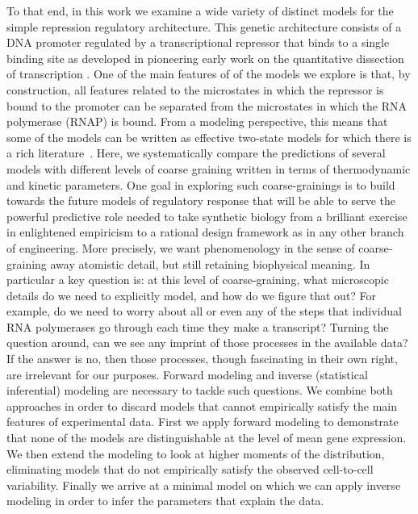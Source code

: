 To that end, in this work we examine a wide variety of distinct models for the
simple repression regulatory architecture. This genetic architecture consists of
a DNA promoter regulated by a transcriptional repressor that binds to a single
binding site as developed in pioneering early work on the quantitative
dissection of transcription \cite{Oehler1994, Oehler1990}. One of the main
features of of the models we explore is that, by construction, all features
related to the microstates in which the repressor is bound to the promoter can
be separated from the microstates in which the RNA polymerase (RNAP) is bound.
From a modeling perspective, this means that some of the models can be written
as effective two-state models for which there is a rich
literature~\cite{Peccoud1995, Shahrezaei2008, Iyer-Biswas2009, Tkacik2009,
Sanchez2013, Jones2014, So2011, Munsky2012}. Here, we systematically compare the
predictions of several models with different levels of coarse graining written
in terms of thermodynamic and kinetic parameters. One goal in exploring such
coarse-grainings is to build towards the future models of regulatory response
that will be able to serve the powerful predictive role needed to take synthetic
biology from a brilliant exercise in enlightened empiricism to a rational design
framework as in any other branch of engineering. More precisely, we want
phenomenology in the sense of coarse-graining away atomistic detail, but still
retaining biophysical meaning. In particular a key question is: at this level of
coarse-graining, what microscopic details do we need to explicitly model, and
how do we figure that out? For example, do we need to worry about all or even
any of the steps that individual RNA polymerases go through each time they make
a transcript? Turning the question around, can we see any imprint of those
processes in the available data? If the answer is no, then those processes,
though fascinating in their own right, are irrelevant for our purposes. Forward
modeling and inverse (statistical inferential) modeling are necessary to tackle
such questions. We combine both approaches in order to discard models that
cannot empirically satisfy the main features of experimental data. First we
apply forward modeling to demonstrate that none of the models are
distinguishable at the level of mean gene expression. We then extend the
modeling to look at higher moments of the distribution, eliminating models that
do not empirically satisfy the observed cell-to-cell variability. Finally we
arrive at a minimal model on which we can apply inverse modeling in order to
infer the parameters that explain the data.

